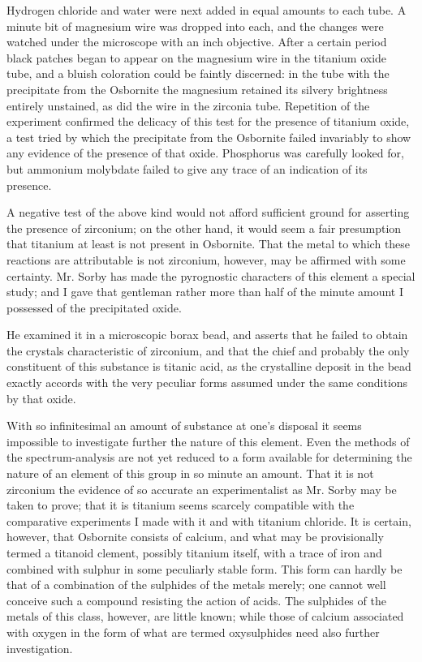 \documentclass[a4paper, 12pt, oneside]{article}
\begin{document}
Hydrogen chloride and water were next added in equal amounts to each tube. A minute bit of magnesium wire was dropped into each, and the changes were watched under the microscope with an inch objective. After a certain period black patches began to appear on the magnesium wire in the titanium oxide tube, and a bluish coloration could be faintly discerned: in the tube with the precipitate from the Osbornite the magnesium retained its silvery brightness entirely unstained, as did the wire in the zirconia tube. Repetition of the experiment confirmed the delicacy of this test for the presence of titanium oxide, a test tried by which the precipitate from the Osbornite failed invariably to show any evidence of the presence of that oxide. Phosphorus was carefully looked for, but ammonium molybdate failed to give any trace of an indication of its presence.

A negative test of the above kind would not afford sufficient ground for asserting the presence of zirconium; on the other hand, it would seem a fair presumption that titanium at least is not present in Osbornite. That the metal to which these reactions are attributable is not zirconium, however, may be affirmed with some certainty. Mr. Sorby has made the pyrognostic characters of this element a special study; and I gave that gentleman rather more than half of the minute amount I possessed of the precipitated oxide.

He examined it in a microscopic borax bead, and asserts that he failed to obtain the crystals characteristic of zirconium, and that the chief and probably the only constituent of this substance is titanic acid, as the crystalline deposit in the bead exactly accords with the very peculiar forms assumed under the same conditions by that oxide.

With so infinitesimal an amount of substance at one's disposal it seems impossible to investigate further the nature of this element. Even the methods of the spectrum-analysis are not yet reduced to a form available for determining the nature of an element of this group in so minute an amount. That it is not zirconium the evidence of so accurate an experimentalist as Mr. Sorby may be taken to prove; that it is titanium seems scarcely compatible with the comparative experiments I made with it and with titanium chloride. It is certain, however, that Osbornite consists of calcium, and what may be provisionally termed a titanoid clement, possibly titanium itself, with a trace of iron and combined with sulphur in some peculiarly stable form. This form can hardly be that of a combination of the sulphides of the metals merely; one cannot well conceive such a compound resisting the action of acids. The sulphides of the metals of this class, however, are little known; while those of calcium associated with oxygen in the form of what are termed oxysulphides need also further investigation.
\end{document}
